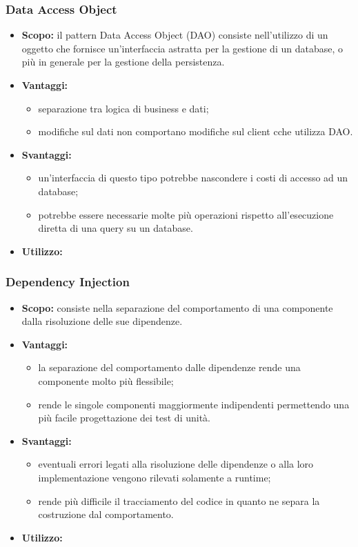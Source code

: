     
   \subsubsection{Data Access Object}
      \begin{itemize}
       \item \textbf{Scopo:} il pattern Data Access Object (DAO) consiste nell'utilizzo di un oggetto che fornisce un'interfaccia astratta per la gestione di un database, o più in generale per la gestione della persistenza.
	\item \textbf{Vantaggi:}
	  \begin{itemize}
	   \item separazione tra logica di business e dati;
	   \item modifiche sul dati non comportano modifiche sul client cche utilizza DAO.
	  \end{itemize}
	\item \textbf{Svantaggi:}
	  \begin{itemize}
	   \item un'interfaccia di questo tipo potrebbe nascondere i costi di accesso ad un database;
	   \item potrebbe essere necessarie molte più operazioni rispetto all'esecuzione diretta di una query su un database.
	  \end{itemize}
	\item \textbf{Utilizzo:}
	\end{itemize}
	
    \subsubsection{Dependency Injection}
     \begin{itemize}
       \item \textbf{Scopo:} consiste nella separazione del comportamento di una componente dalla risoluzione delle sue dipendenze.
	\item \textbf{Vantaggi:}
	  \begin{itemize}
	   \item la separazione del comportamento dalle dipendenze rende una componente molto più flessibile;
	   \item rende le singole componenti maggiormente indipendenti permettendo una più facile progettazione dei test di unità.
	  \end{itemize}
	\item \textbf{Svantaggi:}
	  \begin{itemize}
	   \item eventuali errori legati alla risoluzione delle dipendenze o alla loro implementazione vengono rilevati solamente a runtime;
	   \item rende più difficile il tracciamento del codice in quanto ne separa la costruzione dal comportamento.
	  \end{itemize}
	\item \textbf{Utilizzo:}
	\end{itemize}
  
